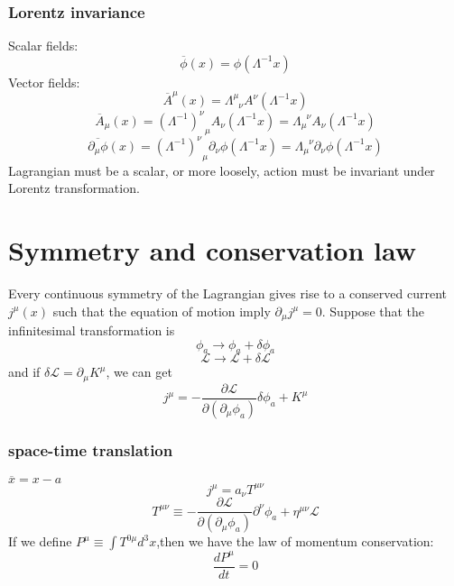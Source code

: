 \subsubsection{Lorentz invariance}

Scalar fields:
\[\overline{\phi}(x) = \phi(\Lambda^{-1} x)\]
Vector fields:
\[\overline{A}^{\mu}(x) = \Lambda^{\mu}_{\phantom{\mu}\nu} A^{\nu}(\Lambda^{-1}x)\]
\[\overline{A}_{\mu}(x) = (\Lambda^{-1})^{\nu}_{\phantom{\mu}\mu} A_{\nu}(\Lambda^{-1}x) = \Lambda_{\mu}^{\phantom{\mu}\nu}A_{\nu}(\Lambda^{-1}x)\]
\[\overline{\partial_{\mu}\phi}(x) = (\Lambda^{-1})^{\nu}_{\phantom{\mu}\mu} \partial_{\nu} \phi (\Lambda^{-1}x) = \Lambda_{\mu}^{\phantom{\mu}\nu} \partial_{\nu} \phi (\Lambda^{-1}x)\]
Lagrangian must be a scalar, or more loosely, action must be invariant under Lorentz transformation.

\section{Symmetry and conservation law}
\begin{newthem}
	Every continuous symmetry of the Lagrangian gives rise to a conserved current $j^{\mu}(x)$ such that the equation of motion imply $\partial_{\mu} j^{\mu} = 0$.
	Suppose that the infinitesimal transformation is
	\[\phi_a \rightarrow \phi_a + \delta \phi_a\]
	\[\mathcal{L} \rightarrow  \mathcal{L} + \delta \mathcal{L} \]
	and if $\delta \mathcal{L} = \partial_{\mu} K^{\mu}$, we can get
	\[j^{\mu} = -\frac{\partial \mathcal{L}}{\partial (\partial_{\mu} \phi_a)} \delta \phi_a + K^{\mu}\]
\end{newthem}

\subsubsection{space-time translation}
$\overline{x} = x - a$ 
\[j^{\mu} = a_{\nu} T^{\mu \nu}\]
\[T^{\mu \nu} \equiv -\frac{\partial \mathcal{L}}{\partial(\partial_{\mu}\phi_a)} \partial^{\nu} \phi_a + \eta^{\mu \nu} \mathcal{L}\]
If we define $P^{\mu} \equiv \int T^{0 \mu} d^3 x$,then we have the law of momentum conservation:
\[\frac{d P^{\mu}}{dt} = 0\]


